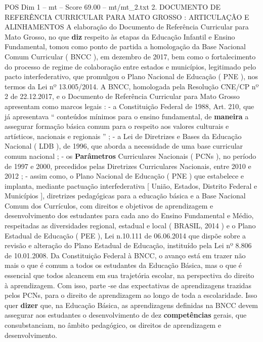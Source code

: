 \begin{textsample}{POS Dim 1 – mt – Score 69.00 – mt/mt\_2.txt}  \label{ex:f1_pos_074}
2.
DOCUMENTO DE REFERÊNCIA CURRICULAR PARA MATO GROSSO : ARTICULAÇÃO E ALINHAMENTOS A elaboração do Documento de Referência Curricular para Mato Grosso, no que \textbf{diz} respeito às etapas da Educação Infantil e Ensino Fundamental, tomou como ponto de partida a homologação da Base Nacional Comum Curricular ( BNCC ), em dezembro de 2017, bem como o fortalecimento do processo de regime de colaboração entre estados e municípios, legitimado pelo pacto interfederativo, que promulgou o Plano Nacional de Educação ( PNE ), nos termos da Lei nº 13.005/2014.
A BNCC, homologada pela Resolução CNE/CP nº 2 de 22.12.2017, e o Documento de Referência Curricular para Mato Grosso apresentam como marcos legais : - a Constituição Federal de 1988, Art. 210, que já apresentava “ conteúdos mínimos para o ensino fundamental, de \textbf{maneira} a assegurar formação básica comum para o respeito aos valores culturais e artísticos, nacionais e regionais ” ; - a Lei de Diretrizes e Bases da Educação Nacional ( LDB ), de 1996, que aborda a necessidade de uma base curricular comum nacional ; - os \textbf{Parâmetros} Curriculares Nacionais ( PCNs ), no período de 1997 e 2000, precedidos pelas Diretrizes Curriculares Nacionais, entre 2010 e 2012 ; - assim como, o Plano Nacional de Educação ( PNE ) que estabelece e implanta, mediante pactuação interfederativa [ União, Estados, Distrito Federal e Municípios ], diretrizes pedagógicas para a educação básica e a Base Nacional Comum dos Currículos, com direitos e objetivos de aprendizagem e desenvolvimento dos estudantes para cada ano do Ensino Fundamental e Médio, respeitadas as diversidades regional, estadual e local ( BRASIL, 2014 ) e o Plano Estadual de Educação ( PEE ), Lei n.10.111 de 06.06.2014 que dispõe sobre a revisão e alteração do Plano Estadual de Educação, instituído pela Lei nº 8.806 de 10.01.2008.
Da Constituição Federal à BNCC, o avanço está em trazer não mais o que é comum a todos os estudantes da Educação Básica, mas o que é essencial que todos alcancem em sua trajetória escolar, na perspectiva do direito à aprendizagem.
Com isso, parte -se das expectativas de aprendizagens trazidas pelos PCNs, para o direito de aprendizagem ao longo de toda a escolaridade.
Isso quer \textbf{dizer} que, na Educação Básica, as aprendizagens definidas na BNCC devem assegurar aos estudantes o desenvolvimento de dez \textbf{competências} gerais, que consubstanciam, no âmbito pedagógico, os direitos de aprendizagem e desenvolvimento.

\end{textsample}
